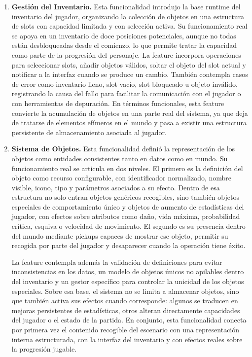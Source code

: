 \begin{enumerate}
\item \textbf{Gestión del Inventario.} Esta funcionalidad introdujo la base runtime del
inventario del jugador, organizando la colección de objetos en una estructura de slots con
capacidad limitada y con selección activa. Su funcionamiento real se apoya en un inventario
de doce posiciones potenciales, aunque no todas están desbloqueadas desde el comienzo, lo
que permite tratar la capacidad como parte de la progresión del personaje. La feature
incorpora operaciones para seleccionar slots, añadir objetos válidos, soltar el objeto del
slot actual y notificar a la interfaz cuando se produce un cambio. También contempla casos
de error como inventario lleno, slot vacío, slot bloqueado u objeto inválido, registrando
la causa del fallo para facilitar la comunicación con el jugador o con herramientas de
depuración. En términos funcionales, esta feature convierte la acumulación de objetos en una
parte real del sistema, ya que deja de tratarse de elementos efímeros en el mundo y pasa a
existir una estructura persistente de almacenamiento asociada al jugador.

\item \textbf{Sistema de Objetos.} Esta funcionalidad definió la representación de los objetos como
entidades consistentes tanto en datos como en mundo. Su funcionamiento real se articula en
dos niveles. El primero es la definición del objeto como recurso configurable, con
identificador normalizado, nombre visible, icono, tipo y parámetros asociados a su efecto.
Dentro de esa estructura no solo entran objetos genéricos recogibles, sino también objetos
especiales de comportamiento único y objetos de aumento de estadísticas del jugador, con
efectos sobre atributos como daño, vida máxima, probabilidad crítica, esquiva o velocidad de
movimiento. El segundo es su presencia dentro del mundo mediante pickups capaces de mostrar
ese objeto, permitir su recogida por parte del jugador y desaparecer cuando la operación
tiene éxito.

La feature contempla además la validación de definiciones para evitar inconsistencias en los
datos, un modelo de objetos únicos no apilables dentro del inventario y un gestor específico
para controlar la unicidad de los objetos especiales. Sobre esa base, el sistema no se limita
a almacenar objetos, sino que también activa sus efectos cuando corresponde: algunos se
traducen en mejoras persistentes de estadísticas, otros alteran directamente capacidades del
jugador o el estado de la partida. En conjunto, esta funcionalidad conecta por primera vez el
contenido recogible del escenario con una representación interna estructurada, con la
interfaz del inventario y con efectos reales sobre la progresión jugable.


\end{enumerate}
